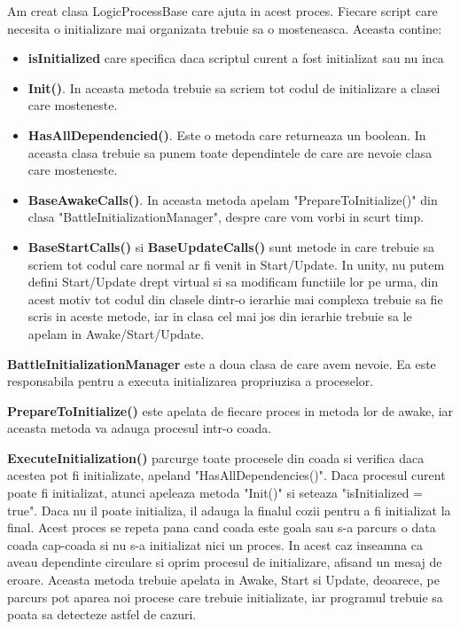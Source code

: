 \documentclass[12pt, a4paper]{article}
\begin{document}
	Am creat clasa LogicProcessBase care ajuta in acest proces. Fiecare script care necesita o initializare mai organizata trebuie sa o mosteneasca. Aceasta contine:
	\begin{itemize}
		\item \textbf{isInitialized} care specifica daca scriptul curent a fost initializat sau nu inca
		\item \textbf{Init()}. In aceasta metoda trebuie sa scriem tot codul de initializare a clasei care mosteneste.
		\item \textbf{HasAllDependencied()}. Este o metoda care returneaza un boolean. In aceasta clasa trebuie sa punem toate dependintele de care are nevoie clasa care mosteneste.
		\item \textbf{BaseAwakeCalls()}. In aceasta metoda apelam "PrepareToInitialize()" din clasa "BattleInitializationManager", despre care vom vorbi in scurt timp.
		\item \textbf{BaseStartCalls()} si \textbf{BaseUpdateCalls()} sunt metode in care trebuie sa scriem tot codul care normal ar fi venit in Start/Update. In unity, nu putem defini Start/Update drept virtual si sa modificam functiile lor pe urma, din acest motiv tot codul din clasele dintr-o ierarhie mai complexa trebuie sa fie scris in aceste metode, iar in clasa cel mai jos din ierarhie trebuie sa le apelam in Awake/Start/Update.
	\end{itemize}

	\textbf{BattleInitializationManager} este a doua clasa de care avem nevoie. Ea este responsabila pentru a executa initializarea propriuzisa a proceselor. 
	\newline
	
	\textbf{PrepareToInitialize()} este apelata de fiecare proces in metoda lor de awake, iar aceasta metoda va adauga procesul intr-o coada.
	\newline
	
	\textbf{ExecuteInitialization()} parcurge toate procesele din coada si verifica daca acestea pot fi initializate, apeland "HasAllDependencies()". Daca procesul curent poate fi initializat, atunci apeleaza metoda "Init()" si seteaza "isInitialized = true". Daca nu il poate initializa, il adauga la finalul cozii pentru a fi initializat la final. Acest proces se repeta pana cand coada este goala sau s-a parcurs o data coada cap-coada si nu s-a initializat nici un proces. In acest caz inseamna ca aveau dependinte circulare si oprim procesul de initializare, afisand un mesaj de eroare. Aceasta metoda trebuie apelata in Awake, Start si Update, deoarece, pe parcurs pot aparea noi procese care trebuie initializate, iar programul trebuie sa poata sa detecteze astfel de cazuri.
	
\end{document}
